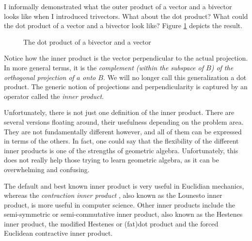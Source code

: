 \documentclass[10pt]{report}
\begin{document}
I informally demonstrated what the outer product of a vector and a
bivector looks like when I introduced trivectors. What about the
dot product? What could the dot product of a vector and a bivector
look like? Figure \ref{fig:dot product vector bivector} depicts
the result.

\begin{figure}[ht]
\centering

\caption{The dot product of a bivector and a vector}
\label{fig:dot product vector bivector}
\end{figure}

Notice how the inner product is the vector perpendicular to the
actual projection. In more general terms, it is the
\emph{complement (within the subspace of $B$) of the orthogonal
projection of $a$ onto $B$.} \cite{bib:dorst part 1} We will no
longer call this generalization a dot product. The generic notion
of projections and perpendicularity is captured by an operator
called the \emph{inner product}.

Unfortunately, there is not just one definition of the inner
product. There are several versions floating around, their
usefulness depending on the problem area. They are not
fundamentally different however, and all of them can be expressed
in terms of the others. In fact, one could say that the
flexibility of the different inner products is one of the
strengths of geometric algebra. Unfortunately, this does not
really help those trying to learn geometric algebra, as it can be
overwhelming and confusing.

The default and best known inner product \cite{bib:hestenes new
foundations} is very useful in Euclidian mechanics, whereas the
\emph{contraction inner product} \cite{bib:dorst part 1}, also
known as the Lounesto inner product, is more useful in computer
science. Other inner products include the  semi-symmetric or
semi-commutative inner product, also known as the Hestenes inner
product, the  modified Hestenes or (fat)dot product and the forced
Euclidean contractive inner product. \cite{bib:lots of inner
products} \cite{bib:leo dorst inner products}
\end{document}
